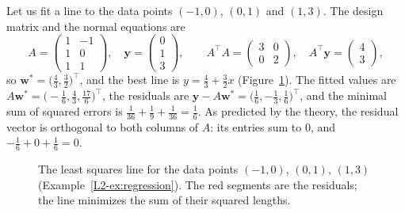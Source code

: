 \begin{example}\label{L2-ex:regression}
    Let us fit a line to the data points $(-1, 0)$, $(0, 1)$ and $(1, 3)$. The design matrix and the normal equations are
    \[A = \begin{pmatrix} 1 & -1 \\ 1 & 0 \\ 1 & 1 \end{pmatrix}, \quad \mathbf{y} = \begin{pmatrix} 0 \\ 1 \\ 3 \end{pmatrix}, \qquad A^\top A = \begin{pmatrix} 3 & 0 \\ 0 & 2 \end{pmatrix}, \quad A^\top \mathbf{y} = \begin{pmatrix} 4 \\ 3 \end{pmatrix},\]
    so $\mathbf{w}^* = \big(\frac{4}{3}, \frac{3}{2}\big)^\top$, and the best line is $y =\frac{4}{3} + \frac{3}{2} x$ (Figure~\ref{L2-fig:regression}). The fitted values are $A\mathbf{w}^* = \big(-\frac{1}{6}, \frac{4}{3}, \frac{17}{6}\big)^\top$, the residuals are $\mathbf{y} - A\mathbf{w}^* = \big(\frac{1}{6}, -\frac{1}{3}, \frac{1}{6}\big)^\top$, and the minimal sum of squared errors is $\frac{1}{36} + \frac{1}{9} + \frac{1}{36} = \frac{1}{6}$. As predicted by the theory, the residual vector is orthogonal to both columns of $A$: its entries sum to $0$, and $-\frac{1}{6} + 0 + \frac{1}{6} = 0$.
\end{example}

\begin{figure}[ht]
    \centering
    \caption[Least squares regression]{The least squares line for the data points $(-1, 0)$, $(0, 1)$, $(1, 3)$ (Example~\ref{L2-ex:regression}). The red segments are the residuals; the line minimizes the sum of their squared lengths.}
    \label{L2-fig:regression}
\end{figure}

